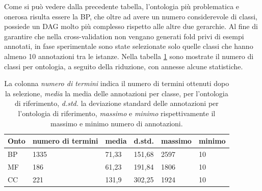 \documentclass[12pt]{report}
\begin{document}
Come si può vedere dalla precedente tabella, l'ontologia più problematica e onerosa risulta essere la BP, che oltre ad avere un numero considerevole di classi, possiede un DAG molto più complesso rispetto alle altre due gerarchie. 
\newline
\newline
\newline
Al fine di garantire che nella cross-validation non vengano generati fold privi di esempi annotati, in fase sperimentale sono state selezionate solo quelle classi che hanno almeno 10 annotazioni tra le istanze. Nella tabella \ref{riduzioneann} sono mostrate il numero di classi per ontologia, a seguito della riduzione, con annesse alcune statistiche.
\begin{table}[h]
\centering
\begin{tabular}{|l|l|l|l|l|l|}
\hline
\textbf{Onto} & \textbf{numero di termini} & \textbf{media} & \textbf{d.std.} & \textbf{massimo} & \textbf{minimo} \\ \hline
BP            & 1335                & 71,33                & 151,68              & 2597                & 10                  \\ \hline
MF            & 186                 & 61,23                & 191,84              & 1806                & 10                  \\ \hline
CC            & 221                 & 131,9                & 302,25              & 1924                & 10                  \\ \hline
\end{tabular}
\caption{\footnotesize{La colonna \emph{numero di termini} indica il numero di termini ottenuti dopo la selezione, \emph{media} la media delle annotazioni per classe, per l'ontologia di riferimento, \emph{d.std.} la deviazione standard delle annotazioni per l'ontologia di riferimento, \emph{massimo} e \emph{minimo} rispettivamente il massimo e minimo numero di annotazioni.}}
\label{riduzioneann}
\end{table}
\newpage
\end{document}
